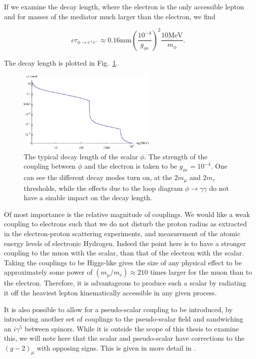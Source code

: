 If we examine the decay length, where the electron is the only accessible lepton and for masses of the mediator much larger than the electron, we find

\begin{equation}
    c \tau_{\phi \rightarrow e^+ e^-} \approx 0.16\textrm{mm} \left(\frac{10^{-4}}{g_{\phi e}}\right)^2 \frac{10\textrm{MeV}}{m_\phi}\textrm{.}
\end{equation}

\noindent The decay length is plotted in Fig.\ \ref{fig:ctau_phi}.

\begin{figure}[h]
    \centering
    \includegraphics[width = 0.6\textwidth]{Figures/misc/ctau_phi}
    \caption{The typical decay length of the scalar $\phi$. The strength of the coupling between $\phi$ and the electron is taken to be $g_{\phi e} = 10^{-4}$. One can see the different decay modes turn on, at the $2 m_\mu$ and $2 m_\tau$ thresholds, while the effects due to the loop diagram $\phi \rightarrow \gamma \gamma$ do not have a sizable impact on the decay length.}
    \label{fig:ctau_phi}
\end{figure}

Of most importance is the relative magnitude of couplings.
We would like a weak coupling to electrons such that we do not disturb the proton radius as extracted in the electron-proton scattering experiments, and measurement of the atomic energy levels of electronic Hydrogen.
Indeed the point here is to have a stronger coupling to the muon with the scalar, than that of the electron with the scalar.
Taking the couplings to be Higgs-like gives the size of any physical effect to be approximately some power of $(m_\mu/m_e) \approx 210$ times larger for the muon than to the electron.
Therefore, it is advantageous to produce such a scalar by radiating it off the heaviest lepton kinematically accessible in any given process.

It is also possible to allow for a pseudo-scalar coupling to be introduced, by introducing another set of couplings to the pseudo-scalar field and sandwiching an $i\gamma^5$ between spinors.
While it is outside the scope of this thesis to examine this, we will note here that the scalar and pseudo-scalar have corrections to the $(g-2)_\mu$ with opposing signs.
This is given in more detail in \cite{Carlson:2015jba}.

